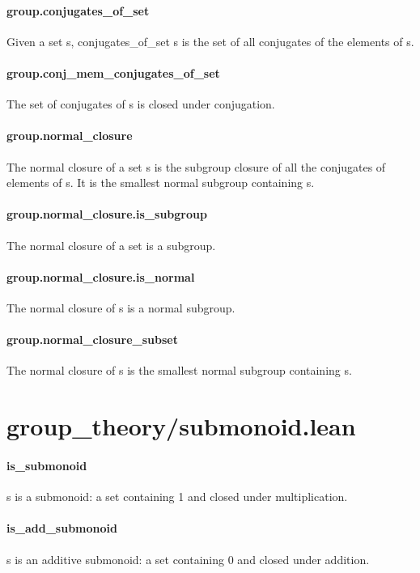 \documentclass{article}
\begin{document}
\paragraph{group.conjugates\_of\_set}
\par
Given a set s, conjugates\_of\_set s is the set of all conjugates of
the elements of s.
\paragraph{group.conj\_mem\_conjugates\_of\_set}
\par
The set of conjugates of s is closed under conjugation.
\paragraph{group.normal\_closure}
\par
The normal closure of a set s is the subgroup closure of all the conjugates of
elements of s. It is the smallest normal subgroup containing s.
\paragraph{group.normal\_closure.is\_subgroup}
\par
The normal closure of a set is a subgroup.
\paragraph{group.normal\_closure.is\_normal}
\par
The normal closure of s is a normal subgroup.
\paragraph{group.normal\_closure\_subset}
\par
The normal closure of s is the smallest normal subgroup containing s.
\section{group\_theory/submonoid.lean}\paragraph{is\_submonoid}
\par
\colorbox[RGB]{253,246,227}{{{{\color[RGB]{101, 123, 131} s }}}} is a submonoid: a set containing 1 and closed under multiplication.
\paragraph{is\_add\_submonoid}
\par
\colorbox[RGB]{253,246,227}{{{{\color[RGB]{101, 123, 131} s }}}} is an additive submonoid: a set containing 0 and closed under addition.
\end{document}
